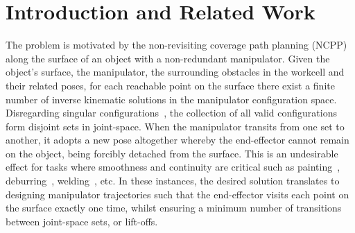 \documentclass[conference]{IEEEtran}
\begin{document}
\section{Introduction and Related Work}
The problem is motivated by the non-revisiting coverage path planning (NCPP) along the surface of an object with a non-redundant manipulator. 
Given the object's surface, the manipulator, 
the surrounding obstacles in the workcell and their related poses, for each reachable point on the surface there exist a finite number of inverse kinematic solutions in the manipulator configuration space. 
Disregarding singular configurations~\cite{Yoshikawa1990Translational}, the collection of all valid configurations form disjoint sets in joint-space. When the manipulator transits from one set to another, it adopts a new pose altogether whereby the end-effector cannot remain on the object, being forcibly detached from the surface. This is an undesirable effect for tasks where smoothness and continuity are critical such as painting~\cite{li2011painting}, deburring~\cite{xie2016grinding}, welding~\cite{lee2011optimal}, etc. 
In these instances, the desired solution translates to designing manipulator trajectories such that the end-effector visits each point on the surface exactly one time, whilst ensuring a minimum number of transitions between joint-space sets, or lift-offs. 

\end{document}
